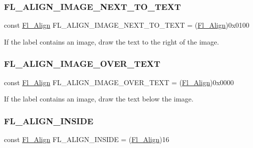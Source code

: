 \subsubsection{\texorpdfstring{F\+L\+\_\+\+A\+L\+I\+G\+N\+\_\+\+I\+M\+A\+G\+E\+\_\+\+N\+E\+X\+T\+\_\+\+T\+O\+\_\+\+T\+E\+XT}{FL\_ALIGN\_IMAGE\_NEXT\_TO\_TEXT}}
{\footnotesize\ttfamily const \hyperlink{_enumerations_8_h_a44e8bcd1e030e65e4f88cbae64a7c3e3}{Fl\+\_\+\+Align} F\+L\+\_\+\+A\+L\+I\+G\+N\+\_\+\+I\+M\+A\+G\+E\+\_\+\+N\+E\+X\+T\+\_\+\+T\+O\+\_\+\+T\+E\+XT = (\hyperlink{_enumerations_8_h_a44e8bcd1e030e65e4f88cbae64a7c3e3}{Fl\+\_\+\+Align})0x0100}

If the label contains an image, draw the text to the right of the image. \mbox{\label{_enumerations_8_h_a44f5822e9594733418ec39f7c061d2d7}} 
\subsubsection{\texorpdfstring{F\+L\+\_\+\+A\+L\+I\+G\+N\+\_\+\+I\+M\+A\+G\+E\+\_\+\+O\+V\+E\+R\+\_\+\+T\+E\+XT}{FL\_ALIGN\_IMAGE\_OVER\_TEXT}}
{\footnotesize\ttfamily const \hyperlink{_enumerations_8_h_a44e8bcd1e030e65e4f88cbae64a7c3e3}{Fl\+\_\+\+Align} F\+L\+\_\+\+A\+L\+I\+G\+N\+\_\+\+I\+M\+A\+G\+E\+\_\+\+O\+V\+E\+R\+\_\+\+T\+E\+XT = (\hyperlink{_enumerations_8_h_a44e8bcd1e030e65e4f88cbae64a7c3e3}{Fl\+\_\+\+Align})0x0000}

If the label contains an image, draw the text below the image. \mbox{\label{_enumerations_8_h_ade440c90fc9c2495fdf04c9cb34fba34}} 
\subsubsection{\texorpdfstring{F\+L\+\_\+\+A\+L\+I\+G\+N\+\_\+\+I\+N\+S\+I\+DE}{FL\_ALIGN\_INSIDE}}
{\footnotesize\ttfamily const \hyperlink{_enumerations_8_h_a44e8bcd1e030e65e4f88cbae64a7c3e3}{Fl\+\_\+\+Align} F\+L\+\_\+\+A\+L\+I\+G\+N\+\_\+\+I\+N\+S\+I\+DE = (\hyperlink{_enumerations_8_h_a44e8bcd1e030e65e4f88cbae64a7c3e3}{Fl\+\_\+\+Align})16}

